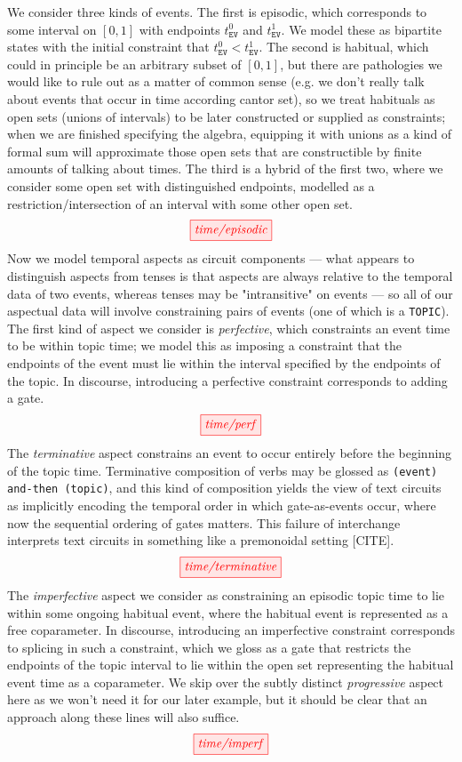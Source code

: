 \begin{defn}
We consider three kinds of events. The first is episodic, which corresponds to some interval on $[0,1]$ with endpoints $t_{\texttt{EV}}^0$ and $t_{\texttt{EV}}^1$. We model these as bipartite states with the initial constraint that $t_{\texttt{EV}}^0 < t_{\texttt{EV}}^1$. The second is habitual, which could in principle be an arbitrary subset of $[0,1]$, but there are pathologies we would like to rule out as a matter of common sense (e.g. we don't really talk about events that occur in time according cantor set), so we treat habituals as open sets (unions of intervals) to be later constructed or supplied as constraints; when we are finished specifying the algebra, equipping it with unions as a kind of formal sum will approximate those open sets that are constructible by finite amounts of talking about times. The third is a hybrid of the first two, where we consider some open set with distinguished endpoints, modelled as a restriction/intersection of an interval with some other open set.
\[\tikzfig{time/episodic}\]
Now we model temporal aspects as circuit components --- what appears to distinguish aspects from tenses is that aspects are always relative to the temporal data of two events, whereas tenses may be "intransitive" on events --- so all of our aspectual data will involve constraining pairs of events (one of which is a \texttt{TOPIC}). The first kind of aspect we consider is \emph{perfective}, which constraints an event time to be within topic time; we model this as imposing a constraint that the endpoints of the event must lie within the interval specified by the endpoints of the topic. In discourse, introducing a perfective constraint corresponds to adding a gate.
\[\tikzfig{time/perf}\]
The \emph{terminative} aspect constrains an event to occur entirely before the beginning of the topic time. Terminative composition of verbs may be glossed as \texttt{(event) and-then (topic)}, and this kind of composition yields the view of text circuits as implicitly encoding the temporal order in which gate-as-events occur, where now the sequential ordering of gates matters. This failure of interchange interprets text circuits in something like a premonoidal setting [CITE].
\[\tikzfig{time/terminative}\]
The \emph{imperfective} aspect we consider as constraining an episodic topic time to lie within some ongoing habitual event, where the habitual event is represented as a free coparameter. In discourse, introducing an imperfective constraint corresponds to splicing in such a constraint, which we gloss as a gate that restricts the endpoints of the topic interval to lie within the open set representing the habitual event time as a coparameter. We skip over the subtly distinct \emph{progressive} aspect here as we won't need it for our later example, but it should be clear that an approach along these lines will also suffice.
\[\tikzfig{time/imperf}\]
\end{defn}

